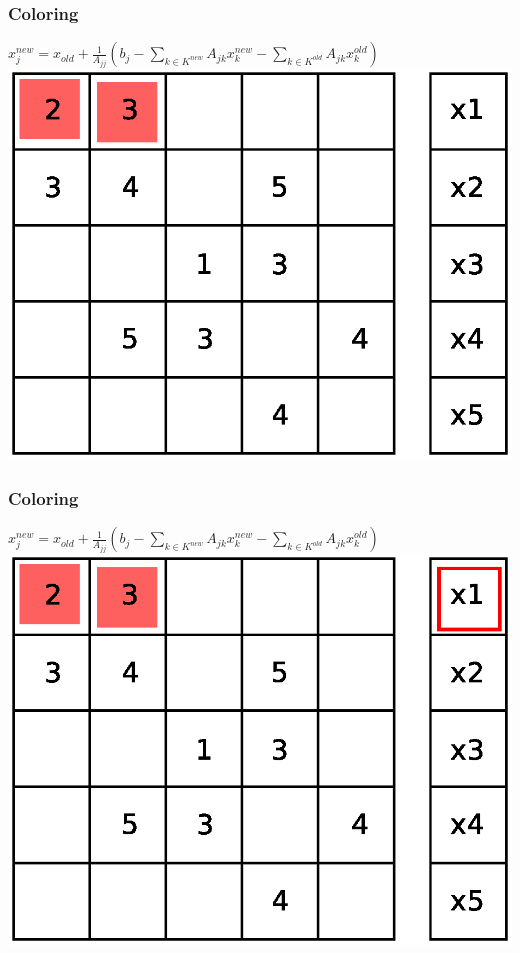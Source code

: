 \documentclass{beamer}
\begin{document}
\begin{frame}
\frametitle{Coloring}
$ x_j^{new} = x_{old} + \frac{1}{A_{jj}} \left(b_{j} - \sum_{k \in K^{new}}A_{jk}
 x_k^{new} - \sum_{k \in K^{old}}A_{jk} x_k^{old}\right)$
\includegraphics[width=0.8\linewidth]{graphic/coloringGS2.eps}
\end{frame}

\begin{frame}
\frametitle{Coloring}
$ x_j^{new} = x_{old} + \frac{1}{A_{jj}} \left(b_{j} - \sum_{k \in K^{new}}A_{jk}
 x_k^{new} - \sum_{k \in K^{old}}A_{jk} x_k^{old}\right)$
\includegraphics[width=0.8\linewidth]{graphic/coloringGS3.eps}
\end{frame}
\end{document}
